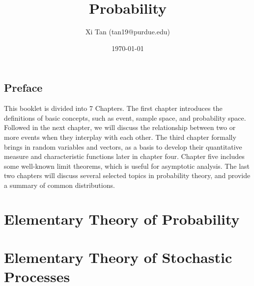 \documentclass{memoir}
\title{Probability}
\author{Xi Tan (tan19@purdue.edu)}
\date{\today}
\begin{document}
\maketitle
\tableofcontents

\newpage
\chapter*{Preface}
This booklet is divided into 7 Chapters. The first chapter introduces the definitions of basic concepts, such as event, sample space, and probability space. Followed in the next chapter, we will discuss the relationship between two or more events when they interplay with each other. The third chapter formally brings in random variables and vectors, as a basis to develop their quantitative measure and characteristic functions later in chapter four. Chapter five includes some well-known limit theorems, which is useful for asymptotic analysis. The last two chapters will discuss several selected topics in probability theory, and provide a summary of common distributions.

\newpage
\part{Elementary Theory of Probability}










\newpage
\part{Elementary Theory of Stochastic Processes}



   

\end{document}
